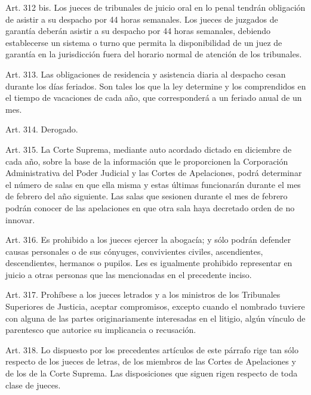     Art. 312 bis. Los jueces de tribunales de juicio oral en lo penal tendrán obligación de asistir a su despacho por 44 horas semanales.
    Los jueces de juzgados de garantía deberán asistir a su despacho por 44 horas semanales, debiendo establecerse un sistema o turno que permita la disponibilidad de un juez de garantía en la jurisdicción fuera del horario normal de atención de los tribunales.


    Art. 313. Las obligaciones de residencia y asistencia diaria al despacho cesan durante los días feriados. Son tales los que la ley determine y los comprendidos en el tiempo de vacaciones de cada año, que corresponderá a un feriado anual de un mes.
   



    Art. 314. Derogado.



    Art. 315. La Corte Suprema, mediante auto acordado dictado en diciembre de cada año, sobre la base de la información que le proporcionen la Corporación Administrativa del Poder Judicial y las Cortes de Apelaciones, podrá determinar el número de salas en que ella misma y estas últimas funcionarán durante el mes de febrero del año siguiente. Las salas que sesionen durante el mes de febrero podrán conocer de las apelaciones en que otra sala haya decretado orden de no innovar.


    Art. 316. Es prohibido a los jueces ejercer la abogacía; y sólo podrán defender causas personales o de sus cónyuges, convivientes civiles, ascendientes, descendientes, hermanos o pupilos.
    Les es igualmente prohibido representar en juicio a otras personas que las mencionadas en el precedente inciso.



    Art. 317. Prohíbese a los jueces letrados y a los ministros de los Tribunales Superiores de Justicia, aceptar compromisos, excepto cuando el nombrado tuviere con alguna de las partes originariamente interesadas en el litigio, algún vínculo de parentesco que autorice su implicancia o recusación.

    Art. 318. Lo dispuesto por los precedentes artículos de este párrafo rige tan sólo respecto de los jueces de letras, de los miembros de las Cortes de Apelaciones y de los de la Corte Suprema.
    Las disposiciones que siguen rigen respecto de toda clase de jueces.


